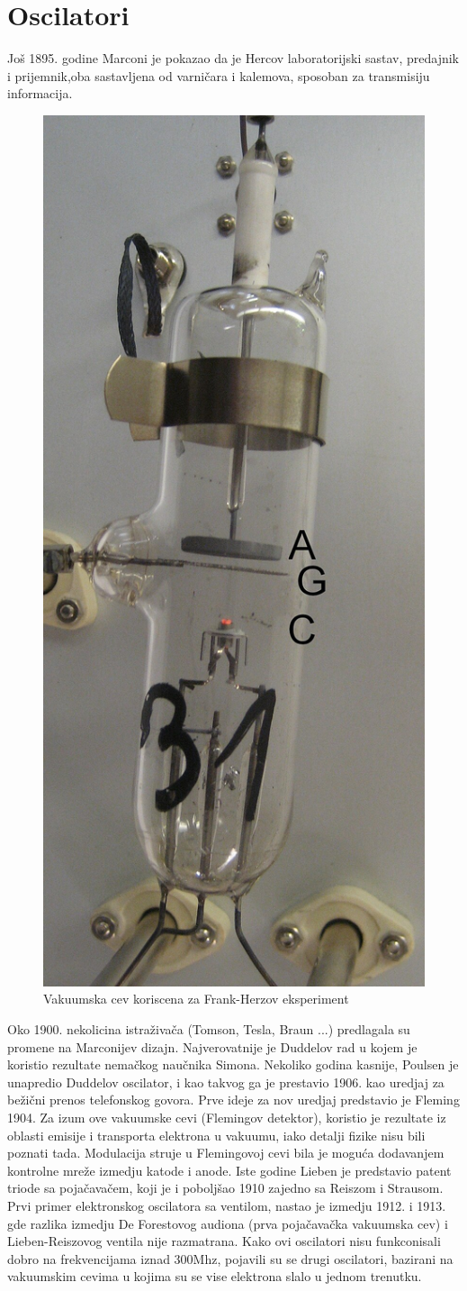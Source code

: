 \documentclass[12pt,a4paper]{article}
\begin{document}
\section{Oscilatori}
Još 1895. godine Marconi je pokazao da je Hercov laboratorijski sastav, predajnik i prijemnik,oba sastavljena od varničara i kalemova, sposoban za transmisiju informacija.\cite{Oscilator}\newline
\begin{figure}
  \includegraphics[height=0.5\textwidth]{FranckHertzHgTube}
  \vspace{-10pt}
  \caption{Vakuumska cev koriscena za Frank-Herzov eksperiment}
\end{figure}
Oko 1900. nekolicina istraživača (Tomson, Tesla, Braun ...) predlagala su promene na Marconijev dizajn. Najverovatnije je Duddelov rad u kojem je koristio rezultate nemačkog naučnika Simona. \newline
Nekoliko godina kasnije, Poulsen je unapredio Duddelov oscilator, i kao takvog ga je prestavio 1906. kao uredjaj za bežični prenos telefonskog govora.\cite{Oscilator}\newline
Prve ideje za nov uredjaj predstavio je Fleming 1904. Za izum ove vakuumske cevi (Flemingov detektor), koristio je rezultate iz oblasti emisije i transporta elektrona u vakuumu, iako detalji fizike nisu bili poznati tada. Modulacija struje u Flemingovoj cevi bila je moguća dodavanjem kontrolne mreže izmedju katode i anode.
Iste godine Lieben je predstavio patent triode sa pojačavačem, koji je i poboljšao 1910 zajedno sa Reiszom i Strausom.
Prvi primer elektronskog oscilatora sa ventilom, nastao je izmedju 1912. i 1913. gde razlika izmedju De Forestovog audiona (prva pojačavačka vakuumska cev) i Lieben-Reiszovog ventila nije razmatrana.\newline
Kako ovi oscilatori nisu funkconisali dobro na frekvencijama iznad 300Mhz, pojavili su se drugi oscilatori, bazirani na vakuumskim cevima u kojima su se vise elektrona slalo u jednom trenutku. 
\end{document}
